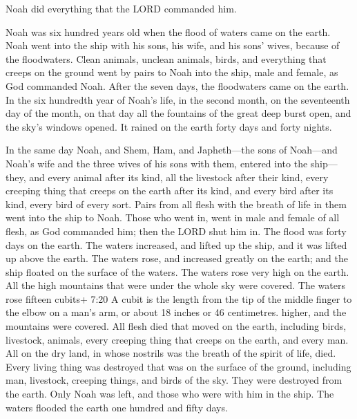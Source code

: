  Noah did everything that the LORD commanded him.

 Noah was six hundred years old when the flood of waters
came on the earth.  Noah went into the ship with his sons,
his wife, and his sons' wives, because of the floodwaters. 
Clean animals, unclean animals, birds, and everything that creeps on the
ground  went by pairs to Noah into the ship, male and
female, as God commanded Noah.  After the seven days, the
floodwaters came on the earth.  In the six hundredth year
of Noah's life, in the second month, on the seventeenth day of the
month, on that day all the fountains of the great deep burst open, and
the sky's windows opened.  It rained on the earth forty
days and forty nights.

 In the same day Noah, and Shem, Ham, and Japheth---the
sons of Noah---and Noah's wife and the three wives of his sons with
them, entered into the ship---  they, and every animal
after its kind, all the livestock after their kind, every creeping thing
that creeps on the earth after its kind, and every bird after its kind,
every bird of every sort.  Pairs from all flesh with the
breath of life in them went into the ship to Noah.  Those
who went in, went in male and female of all flesh, as God commanded him;
then the LORD shut him in.  The flood was forty days on the
earth. The waters increased, and lifted up the ship, and it was lifted
up above the earth.  The waters rose, and increased greatly
on the earth; and the ship floated on the surface of the waters.
 The waters rose very high on the earth. All the high
mountains that were under the whole sky were covered.  The
waters rose fifteen cubits+ 7:20 A cubit is the length from the tip of
the middle finger to the elbow on a man's arm, or about 18 inches or 46
centimetres. higher, and the mountains were covered.  All
flesh died that moved on the earth, including birds, livestock, animals,
every creeping thing that creeps on the earth, and every man.
 All on the dry land, in whose nostrils was the breath of
the spirit of life, died.  Every living thing was destroyed
that was on the surface of the ground, including man, livestock,
creeping things, and birds of the sky. They were destroyed from the
earth. Only Noah was left, and those who were with him in the ship.
 The waters flooded the earth one hundred and fifty days.

